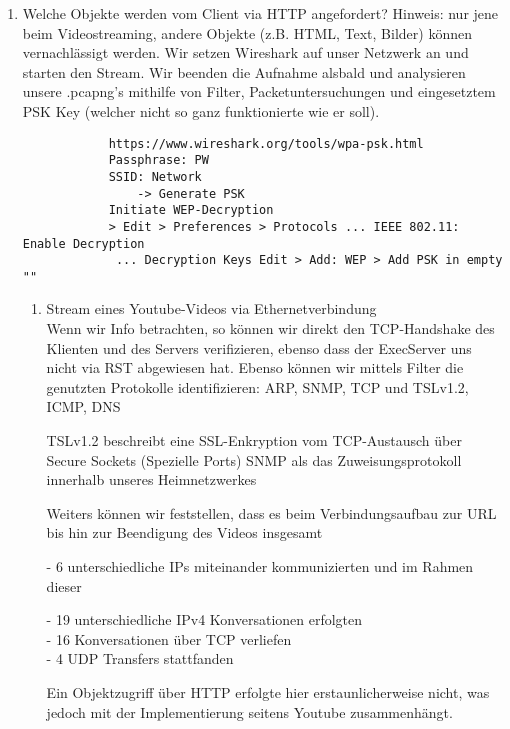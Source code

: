 \documentclass[11pt]{article}
\begin{document}
\begin{enumerate}
        \item Welche Objekte werden vom Client via HTTP angefordert? Hinweis: nur jene beim Videostreaming, andere Objekte (z.B. HTML, Text, Bilder) können vernachlässigt werden.
            Wir setzen Wireshark auf unser Netzwerk an und starten  den Stream.
            Wir beenden die Aufnahme alsbald und analysieren unsere .pcapng's mithilfe von Filter, Packetuntersuchungen und
            eingesetztem PSK Key (welcher nicht so ganz funktionierte wie er soll).
        \begin{verbatim}
            https://www.wireshark.org/tools/wpa-psk.html
            Passphrase: PW
            SSID: Network
                -> Generate PSK
            Initiate WEP-Decryption
            > Edit > Preferences > Protocols ... IEEE 802.11: Enable Decryption
             ... Decryption Keys Edit > Add: WEP > Add PSK in empty ""
        \end{verbatim}
        \begin{enumerate}[\thesection .1]
            \item Stream eines Youtube-Videos via Ethernetverbindung\\
            Wenn wir Info betrachten, so können wir direkt den TCP-Handshake des Klienten und des Servers verifizieren, ebenso dass
            der ExecServer uns nicht via RST abgewiesen hat.
            Ebenso können wir mittels Filter die genutzten Protokolle identifizieren: ARP,  SNMP, TCP und TSLv1.2, ICMP, DNS
            \begin{addmargin}[1em]{1em}
                TSLv1.2 beschreibt eine SSL-Enkryption vom TCP-Austausch über Secure Sockets (Spezielle Ports)
                SNMP als das Zuweisungsprotokoll innerhalb unseres Heimnetzwerkes
            \end{addmargin}
            Weiters können wir feststellen, dass es beim Verbindungsaufbau zur URL bis hin zur Beendigung des Videos insgesamt
            \begin{addmargin}[1em]{1em}
                - 6 unterschiedliche IPs miteinander kommunizierten und im Rahmen dieser
                \begin{addmargin}[1em]{1em}
                    - 19 unterschiedliche IPv4 Konversationen erfolgten\\
                    - 16 Konversationen über TCP verliefen\\
                    - 4 UDP Transfers stattfanden\\
                \end{addmargin}
            \end{addmargin}
            Ein Objektzugriff über HTTP erfolgte hier erstaunlicherweise nicht, was jedoch mit der Implementierung seitens Youtube zusammenhängt.\\


\end{enumerate}
\end{enumerate}
\end{document}
